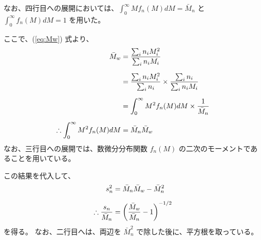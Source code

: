 \documentclass[a4paper,11pt]{ltjsarticle}
\begin{document}
\begin{appendix}
なお、四行目への展開においては、$\displaystyle \int_0^{\infty} M f_n(M) dM = \bar{M}_n$ と $\displaystyle \int_0^{\infty} f_n(M) dM = 1$ を用いた。

ここで、(\ref{eq:Mw}) 式より、
\begin{align}
{\bar M}_w 
	&= \dfrac{\sum_i n_i M_i^2}{\sum_i n_i M_i}\notag \\[6pt]
	&= \dfrac{\sum_i n_i M_i^2}{\sum_i n_i} \times \dfrac{\sum_i n_i}{\sum_i n_i M_i}\notag \\[6pt]
	&= \displaystyle \int_0^{\infty} M^2 f_n(M) dM \times \dfrac{1}{\bar{M}_n }\notag \\[6pt]
\therefore \displaystyle \int_0^{\infty} M^2 f_n(M) dM &= \bar{M}_n \bar{M}_w
\end{align}
なお、三行目への展開では、数微分分布関数 $f_n(M)$ の二次のモーメントであることを用いている。

この結果を代入して、
\begin{align}
s_n^2 &= \bar{M}_n \bar{M}_w - \bar{M}_n^2\notag \\[6pt]
\therefore \dfrac{s_n}{\bar{M}_n} &= \left(\dfrac{\bar{M}_w}{ \bar{M}_n} - 1 \right)^{-1/2}
\end{align}
を得る。
なお、二行目へは、両辺を $\bar{M}_n^2$ で除した後に、平方根を取っている。

\end{appendix}


%

%
%
\end{document}
